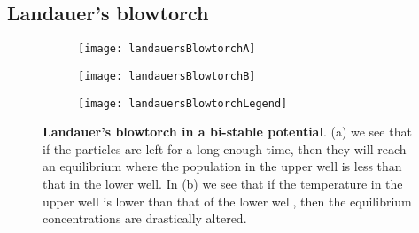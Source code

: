 \subsection{Landauer's blowtorch} \label{landauersBlowtorch}
\begin{figure}[h]
	\begin{subfigure}{0.42\textwidth}
		\texttt{[image: landauersBlowtorchA]}
		\caption{\label{fig:landauerA}}
	\end{subfigure}
	\begin{subfigure}{0.42\textwidth}
		\texttt{[image: landauersBlowtorchB]}
		\caption{\label{fig:landauerB}}
	\end{subfigure}
	\begin{subfigure}{0.145\textwidth}
		\texttt{[image: landauersBlowtorchLegend]}
	\end{subfigure}

\caption{\textbf{Landauer's blowtorch in a bi-stable potential}. (a) we see that if the particles are left for a long enough time, then they will reach an equilibrium where the population in the upper well is less than that in the lower well. In (b) we see that if the temperature in the upper well is lower than that of the lower well, then the equilibrium concentrations are drastically altered.}
\label{fig:landauersBlowtorch}
\end{figure}
